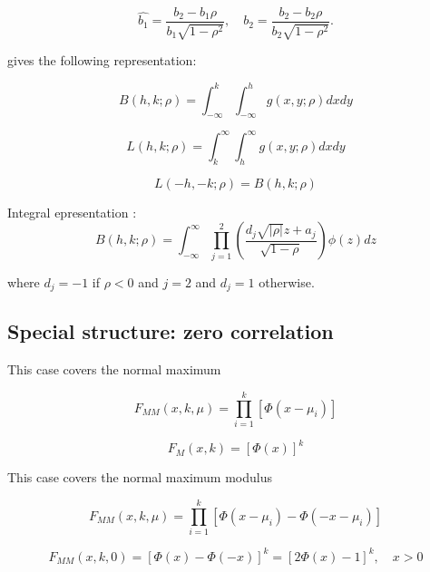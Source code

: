 \begin{equation}
	\widehat{b_1} = \frac{b_2 - b_1 \rho}{b_1 \sqrt{1-\rho^2}}, \quad \widehat{b_2} = \frac{b_2 - b_2 \rho}{b_2 \sqrt{1-\rho^2}}.
\end{equation}


\vspace{0.3cm}
\cite{abramowitz_handbook_1970} gives the following representation:

\begin{equation}
	B(h,k;\rho) = \int_{-\infty}^k {\int_{-\infty}^h} g(x,y;\rho) dx dy
\end{equation}

\begin{equation}
	L(h,k;\rho) = \int_{k}^\infty {\int_{h}^\infty} g(x,y;\rho) dx dy
\end{equation}

\begin{equation}
	L(-h,-k;\rho) = B(h,k;\rho) 
\end{equation}

Integral epresentation \cite{Tong_1990}:
\begin{equation}
	B(h,k;\rho) = \int_{-\infty}^\infty {\prod_{j=1}^2} \left(\frac{d_j \sqrt{\vert \rho \vert} z + a_j} {\sqrt{1-\rho}} \right) \phi(z) dz
\end{equation}

where $d_j=-1$ if $\rho<0$ and $j=2$ and $d_j=1$ otherwise.


\subsection{Special structure: zero correlation}
This case covers the normal maximum 

\begin{equation}
	F_{MM}(x,k,\mu) = \prod_{i=1}^k \left[\Phi(x-\mu_i)\right]
\end{equation}

\begin{equation}
	F_{M}(x,k) = \left[\Phi(x)\right]^k
\end{equation}


This case covers the normal maximum modulus

\begin{equation}
	F_{MM}(x,k,\mu) = \prod_{i=1}^k \left[\Phi(x-\mu_i) - \Phi(-x-\mu_i)\right]
\end{equation}


\begin{equation}
	F_{MM}(x,k,0) = \left[\Phi(x) - \Phi(-x)\right]^k = \left[2\Phi(x) - 1\right]^k, \quad x>0
\end{equation}


